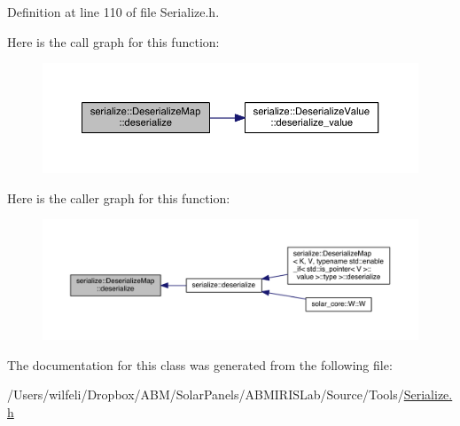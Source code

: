 Definition at line 110 of file Serialize.\+h.



Here is the call graph for this function\+:
\nopagebreak
\begin{figure}[H]
\begin{center}
\leavevmode
\includegraphics[width=350pt]{classserialize_1_1_deserialize_map_af4827270beb08c018e840b9cec766cde_cgraph}
\end{center}
\end{figure}




Here is the caller graph for this function\+:
\nopagebreak
\begin{figure}[H]
\begin{center}
\leavevmode
\includegraphics[width=350pt]{classserialize_1_1_deserialize_map_af4827270beb08c018e840b9cec766cde_icgraph}
\end{center}
\end{figure}




The documentation for this class was generated from the following file\+:\begin{DoxyCompactItemize}
\item 
/\+Users/wilfeli/\+Dropbox/\+A\+B\+M/\+Solar\+Panels/\+A\+B\+M\+I\+R\+I\+S\+Lab/\+Source/\+Tools/\hyperlink{_serialize_8h}{Serialize.\+h}\end{DoxyCompactItemize}
